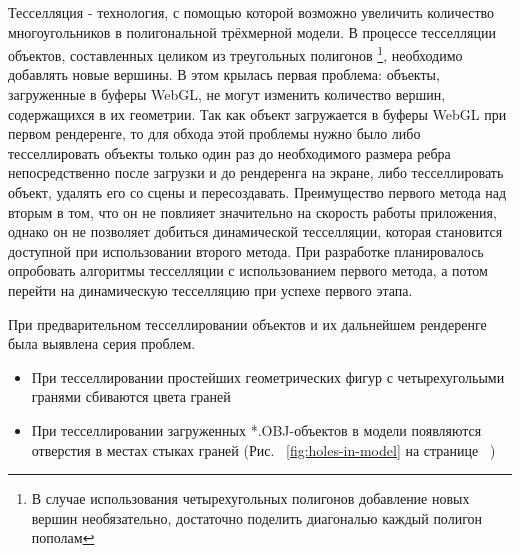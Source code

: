 \documentclass[12pt, a4paper]{article}
\begin{document}
Тесселляция - технология, с помощью которой возможно увеличить количество
многоугольников в полигональной трёхмерной модели. В процессе тесселляции
объектов, составленных целиком из треугольных полигонов \footnote{В случае
использования четырехугольных полигонов добавление новых вершин необязательно,
достаточно поделить диагональю каждый полигон пополам}, необходимо добавлять
новые вершины. В этом крылась первая проблема: объекты, загруженные в буферы
WebGL, не могут изменить количество вершин, содержащихся в их геометрии. Так как
объект загружается в буферы WebGL при первом рендеренге, то для обхода этой
проблемы нужно было либо тесселлировать объекты только один раз до
необходимого размера ребра непосредственно после загрузки и до рендеренга на
экране, либо тесселлировать объект, удалять его со сцены и пересоздавать.
Преимущество первого метода над вторым в том, что он не повлияет значительно на
скорость работы приложения, однако он не позволяет добиться динамической
тесселляции, которая становится доступной при использовании второго метода.
При разработке планировалось опробовать алгоритмы тесселляции с использованием
первого метода, а потом перейти на динамическую тесселляцию при успехе первого
этапа.

При предварительном тесселлировании объектов и их дальнейшем рендеренге была
выявлена серия проблем.

\begin{itemize}
    \item При тесселлировании простейших геометрических фигур с четырехугольыми
    гранями сбиваются цвета граней
    \item При тесселлировании загруженных *.OBJ-объектов в модели появляются
    отверстия в местах стыках граней (Рис. ~\ref{fig:holes-in-model} на странице
    ~\pageref{fig:holes-in-model})
\end{itemize}
\end{document}
